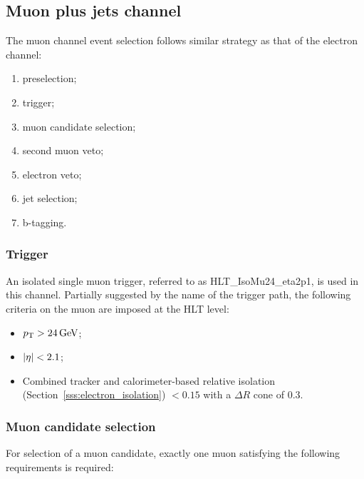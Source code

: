 \subsection{Muon plus jets channel}
\label{ss_xsection:mujets}
The muon channel event selection follows similar strategy as that of the electron channel:

\begin{enumerate}[topsep=\parskip, parsep=\parskip, itemsep=\parskip, leftmargin=\leftmargin]
	\item preselection;
	\item trigger;
	\item muon candidate selection;
	\item second muon veto;
	\item electron veto;
	\item jet selection;
	\item b-tagging.
\end{enumerate}

\subsubsection*{Trigger}
An isolated single muon trigger, referred to as HLT\_IsoMu24\_eta2p1, is used in this channel. Partially suggested by
the name of the trigger path, the following criteria on the muon are imposed at the HLT level:

\begin{itemize}
	\item $\pt > \SI{24}{\GeV}$;
	\item $\lvert \eta \rvert < 2.1$;
	\item Combined tracker and calorimeter-based relative isolation (Section~\ref{sss:electron_isolation}) \reliso $<
0.15$ with a $\Delta R$ cone of 0.3.

\end{itemize}

\subsubsection*{Muon candidate selection}
For selection of a muon candidate, exactly one muon satisfying the following requirements is required:

